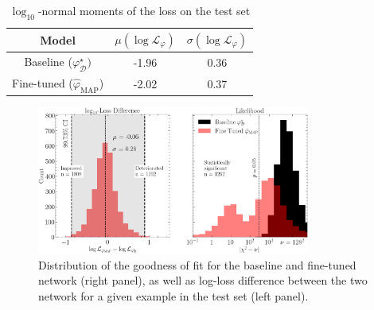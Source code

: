 \begin{table}[H]
    \centering
    \caption{$\log_{10}$-normal moments of the loss on the test set}
    \label{tab:loss}
    \begin{tabular}{ccc}
        \hline
          Model  & $\mu(\log \mathcal{L}_\varphi)$ & $\sigma(\log \mathcal{L}_\varphi)$ \\
        \hline \hline
        Baseline ($\varphi_{\mathcal{D}}^\star)$ &  -1.96 & 0.36 \\
        Fine-tuned ($\hat{\varphi}_{\mathrm{MAP}}$) & -2.02 & 0.37 \\\hline
    \end{tabular}
\end{table}


\begin{figure}[H]
        \centering
        \includegraphics[width=0.8\textwidth]{figures/loss_and_likelihood}
        \caption{Distribution of the goodness of fit for the baseline and fine-tuned network (right panel), as well as log-loss difference between the two network for a given example in the test set (left panel).
}
        \label{fig:loss and chi squared}
\end{figure}


